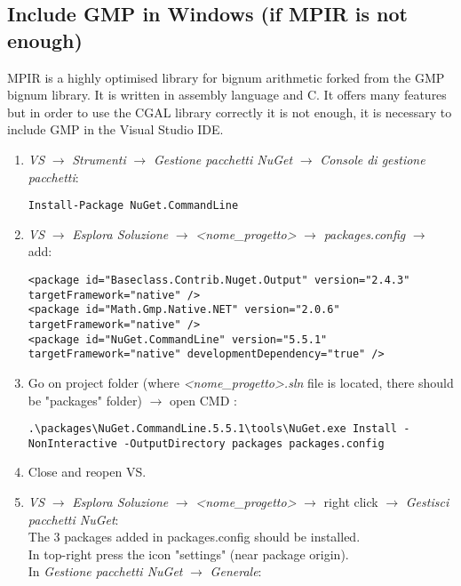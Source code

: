 \documentclass[11pt, english, openany]{report}
\begin{document}
\begin{appendices}
\subsection{Include GMP in Windows (if MPIR is not enough)}
MPIR is a highly optimised library for bignum arithmetic forked from the GMP bignum library. It is written in assembly language and C. It offers many features but in order to use the CGAL library correctly it is not enough, it is necessary to include GMP in the Visual Studio IDE.
\begin{enumerate}
\item \textit{VS} $\rightarrow$ \textit{Strumenti} $\rightarrow$ \textit{Gestione pacchetti NuGet} $\rightarrow$ \textit{Console di gestione pacchetti}:
	
\begin{lstlisting}
Install-Package NuGet.CommandLine
\end{lstlisting}	

\item \textit{VS} $\rightarrow$ \textit{Esplora Soluzione} $\rightarrow$ \textit{<nome\_progetto>} $\rightarrow$ \textit{packages.config} $\rightarrow$ add: 

\begin{lstlisting}
<package id="Baseclass.Contrib.Nuget.Output" version="2.4.3" targetFramework="native" />
<package id="Math.Gmp.Native.NET" version="2.0.6" targetFramework="native" />
<package id="NuGet.CommandLine" version="5.5.1" targetFramework="native" developmentDependency="true" />
\end{lstlisting}
		

\item Go on project folder (where \textit{<nome\_progetto>.sln} file is located, there should be "packages" folder) $\rightarrow$ open CMD :

\begin{lstlisting}
.\packages\NuGet.CommandLine.5.5.1\tools\NuGet.exe Install -NonInteractive -OutputDirectory packages packages.config
\end{lstlisting}
	
\item Close and reopen VS.

\item \textit{VS} $\rightarrow$ \textit{Esplora Soluzione} $\rightarrow$ \textit{<nome\_progetto>} $\rightarrow$ right click $\rightarrow$ \textit{Gestisci pacchetti NuGet}: \\
The 3 packages added in packages.config should be installed.\\
In top-right press the icon "settings" (near package origin). \\
In \textit{Gestione pacchetti NuGet} $\rightarrow$ \textit{Generale}: \\


\end{enumerate}
\end{appendices}
\end{document}
